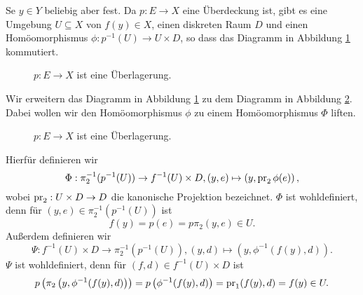 \documentclass[a4paper,10pt]{article}
\begin{document}
Se $y \in Y$ beliebig aber fest. Da $p : E \to X$ eine Überdeckung ist, gibt es eine Umgebung $U \subseteq X$ von $f(y) \in X$, einen diskreten Raum $D$ und einen Homöomorphismus $\phi : p^{-1}(U) \to U \times D$, so dass das Diagramm in Abbildung \ref{fig: unterer Teil} kommutiert.
\begin{figure}[ht]\centering
 \caption{$p : E \to X$ ist eine Überlagerung.}
 \label{fig: unterer Teil}
\end{figure}

Wir erweitern das Diagramm in Abbildung \ref{fig: unterer Teil} zu dem Diagramm in Abbildung \ref{fig: gesammtes Diagramm}. Dabei wollen wir den Homöomorphismus $\phi$ zu einem Homöomorphismus $\Phi$ liften.
\begin{figure}[ht]\centering
 \caption{$p : E \to X$ ist eine Überlagerung.}
 \label{fig: gesammtes Diagramm}
\end{figure}

Hierfür definieren wir
\[
 \Phi : \pi_2^{-1}(p^{-1}(U)) \to f^{-1}(U) \times D, (y,e) \mapsto \left( y, \operatorname{pr}_2 \phi(e) \right),
\]
wobei $\operatorname{pr}_2 : U \times D \to D$ die kanonische Projektion bezeichnet. $\Phi$ ist wohldefiniert, denn für $(y,e) \in \pi_2^{-1}(p^{-1}(U))$ ist
\[
 f(y) = p(e) = p \pi_2(y,e) \in U.
\]
Außerdem definieren wir
\[
 \Psi : f^{-1}(U) \times D \to \pi_2^{-1}(p^{-1}(U)), (y,d) \mapsto \left( y, \phi^{-1}(f(y),d) \right).
\]
$\Psi$ ist wohldefiniert, denn für $(f,d) \in f^{-1}(U) \times D$ ist
\[
 p\left(\pi_2\left( y, \phi^{-1}(f(y),d) \right) \right)
 = p\left( \phi^{-1}(f(y),d) \right)
 = \operatorname{pr}_1(f(y),d)
 = f(y)
 \in U.
\]
\end{document}
